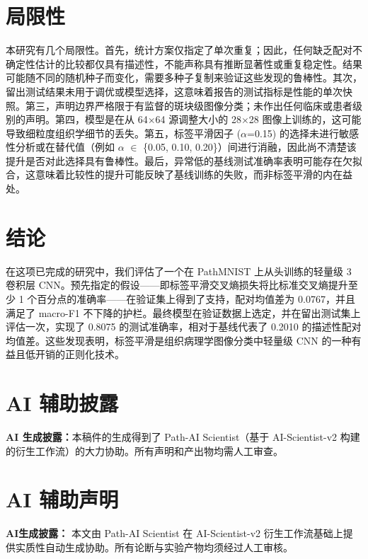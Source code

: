 \documentclass[10pt]{article}
\begin{document}
\section{局限性}
本研究有几个局限性。首先，统计方案仅指定了单次重复；因此，任何缺乏配对不确定性估计的比较都仅具有描述性，不能声称具有推断显著性或重复稳定性。结果可能随不同的随机种子而变化，需要多种子复制来验证这些发现的鲁棒性。其次，留出测试结果未用于调优或模型选择，这意味着报告的测试指标是性能的单次快照。第三，声明边界严格限于有监督的斑块级图像分类；未作出任何临床或患者级别的声明。第四，模型是在从 64\ensuremath{\times}64 源调整大小的 28\ensuremath{\times}28 图像上训练的，这可能导致细粒度组织学细节的丢失。第五，标签平滑因子 (\ensuremath{\alpha}=0.15) 的选择未进行敏感性分析或在替代值（例如 \ensuremath{\alpha} \ensuremath{\in} \{0.05, 0.10, 0.20\}）间进行消融，因此尚不清楚该提升是否对此选择具有鲁棒性。最后，异常低的基线测试准确率表明可能存在欠拟合，这意味着比较性的提升可能反映了基线训练的失败，而非标签平滑的内在益处。
\section{结论}
在这项已完成的研究中，我们评估了一个在 PathMNIST 上从头训练的轻量级 3 卷积层 CNN。预先指定的假设——即标签平滑交叉熵损失将比标准交叉熵提升至少 1 个百分点的准确率——在验证集上得到了支持，配对均值差为 0.0767，并且满足了 macro-F1 不下降的护栏。最终模型在验证数据上选定，并在留出测试集上评估一次，实现了 0.8075 的测试准确率，相对于基线代表了 0.2010 的描述性配对均值差。这些发现表明，标签平滑是组织病理学图像分类中轻量级 CNN 的一种有益且低开销的正则化技术。
\section{AI 辅助披露}
\textbf{AI 生成披露：}本稿件的生成得到了 Path-AI Scientist（基于 AI-Scientist-v2 构建的衍生工作流）的大力协助。所有声明和产出物均需人工审查。
\section{AI 辅助声明}
\textbf{AI生成披露：} 本文由 Path-AI Scientist 在 AI-Scientist-v2 衍生工作流基础上提供实质性自动生成协助。所有论断与实验产物均须经过人工审核。
\FloatBarrier
\end{document}
